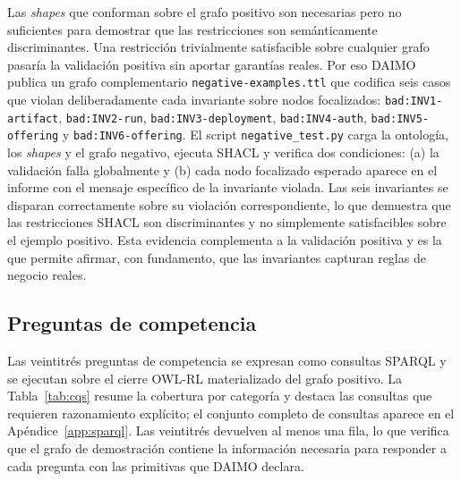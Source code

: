 \documentclass[11pt,a4paper]{article}
\newcommand{\code}[1]{\texttt{#1}}
\begin{document}
Las \emph{shapes} que conforman sobre el grafo positivo son necesarias pero no suficientes para demostrar que las restricciones son semánticamente discriminantes. Una restricción trivialmente satisfacible sobre cualquier grafo pasaría la validación positiva sin aportar garantías reales. Por eso DAIMO publica un grafo complementario \code{negative-examples.ttl} que codifica seis casos que violan deliberadamente cada invariante sobre nodos focalizados: \texttt{bad:INV1-artifact}, \texttt{bad:INV2-run}, \texttt{bad:INV3-deployment}, \texttt{bad:INV4-auth}, \texttt{bad:INV5-offering} y \texttt{bad:INV6-offering}. El script \code{negative\_test.py} carga la ontología, los \emph{shapes} y el grafo negativo, ejecuta SHACL y verifica dos condiciones: (a) la validación falla globalmente y (b) cada nodo focalizado esperado aparece en el informe con el mensaje específico de la invariante violada. Las seis invariantes se disparan correctamente sobre su violación correspondiente, lo que demuestra que las restricciones SHACL son discriminantes y no simplemente satisfacibles sobre el ejemplo positivo. Esta evidencia complementa a la validación positiva y es la que permite afirmar, con fundamento, que las invariantes capturan reglas de negocio reales.

\subsection{Preguntas de competencia}

Las veintitrés preguntas de competencia se expresan como consultas SPARQL y se ejecutan sobre el cierre OWL-RL materializado del grafo positivo. La Tabla~\ref{tab:cqs} resume la cobertura por categoría y destaca las consultas que requieren razonamiento explícito; el conjunto completo de consultas aparece en el Apéndice~\ref{app:sparql}. Las veintitrés devuelven al menos una fila, lo que verifica que el grafo de demostración contiene la información necesaria para responder a cada pregunta con las primitivas que DAIMO declara.
\end{document}
